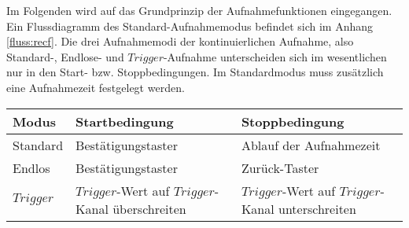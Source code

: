 Im Folgenden wird auf das Grundprinzip der Aufnahmefunktionen eingegangen. Ein Flussdiagramm des Standard-Aufnahmemodus befindet sich im Anhang \ref{fluss:recf}.\newline
Die drei Aufnahmemodi der kontinuierlichen Aufnahme, also Standard-, Endlose- und $Trigger$-Aufnahme unterscheiden sich im wesentlichen nur in den Start- bzw. Stoppbedingungen. Im Standardmodus muss zusätzlich eine Aufnahmezeit festgelegt werden. 
\begin{table}[h]
	\begin{center}
		\begin{tabular}{l | p{6cm} | p{6cm}}
			Modus & Startbedingung & Stoppbedingung\\
			\hline
			Standard & Bestätigungstaster & Ablauf der Aufnahmezeit\\
			Endlos & Bestätigungstaster & Zurück-Taster\\
			$Trigger$ & $Trigger$-Wert auf $Trigger$-Kanal überschreiten & $Trigger$-Wert auf $Trigger$-Kanal unterschreiten
		\end{tabular}
	\end{center}
\end{table}\newline
